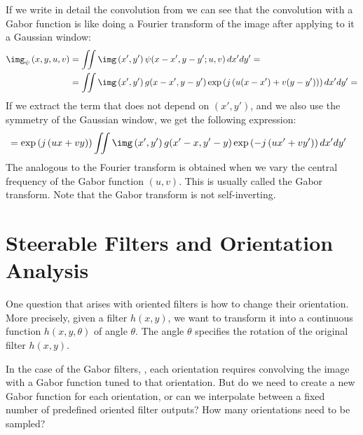 If we write in detail the convolution from \eqn{\ref{eq:gaborconv}} we can see that the convolution with a Gabor function is like doing a Fourier transform of the image after applying to it a Gaussian window:
\begin{equation*}
	\begin{split}
		\img_{\psi} \left(x,y,u,v \right) & =   \iint \img \left(x',y'\right) \psi(x-x',y-y';u,v) \, dx' dy' =                                              \\
		                                  & = \iint  \img \left(x',y'\right) g(x-x',y-y') \exp \left( j \left(u (x-x') + v (y-y') \right) \right) dx' dy' = \\
	\end{split}
\end{equation*}
If we extract the term that does not depend on $(x',y')$, and we also use the symmetry of the Gaussian window, we get the following expression:
\begin{equation}
	\begin{split}
		 & = \exp \left( j \left(u x + v y \right) \right) \iint \img \left(x',y'\right) g(x'-x,y'-y) \exp \left(- j \left(u x' + v y' \right) \right) dx' dy'
	\end{split}
\end{equation}
The analogous to the Fourier transform is obtained when we vary the central frequency of the Gabor function $(u,v)$. This is usually called the Gabor transform. Note that the Gabor transform is not self-inverting.



\section{Steerable Filters and Orientation Analysis}


One question that arises with oriented filters is how to change their
orientation.  More precisely, given a filter $h(x,y)$, we want to transform it into a continuous function $h(x,y, \theta)$ of angle $\theta$. The angle $\theta$ specifies the rotation of the original filter $h(x,y)$.

In the case of the Gabor filters, \eqn{\ref{eq:gaborcomplexfilter}}, each orientation requires convolving the image with a Gabor function tuned to that orientation. But do we need to create a new Gabor function for each orientation, or can we interpolate between a fixed number of predefined oriented filter outputs? How many orientations need to be sampled?

